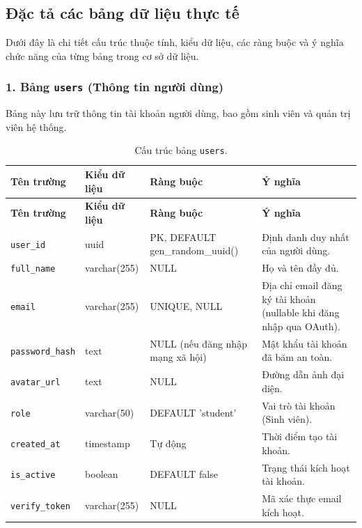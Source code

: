 \subsection{Đặc tả các bảng dữ liệu thực tế}

Dưới đây là chi tiết cấu trúc thuộc tính, kiểu dữ liệu, các ràng buộc và ý nghĩa chức năng của từng bảng trong cơ sở dữ liệu.

\subsubsection*{1. Bảng \texttt{users} (Thông tin người dùng)}

Bảng này lưu trữ thông tin tài khoản người dùng, bao gồm sinh viên và quản trị viên hệ thống.

\begin{footnotesize}\begin{longtable}{|L{3.5cm}|L{2.0cm}|L{3.0cm}|L{5.5cm}|}
\caption{Cấu trúc bảng \texttt{users}.}
\label{tab:users} \\
\hline
\textbf{Tên trường} & \textbf{Kiểu dữ liệu} & \textbf{Ràng buộc} & \textbf{Ý nghĩa} \\
\hline
\endfirsthead
\hline
\textbf{Tên trường} & \textbf{Kiểu dữ liệu} & \textbf{Ràng buộc} & \textbf{Ý nghĩa} \\
\hline
\endhead
\texttt{user\_id} & uuid & PK, DEFAULT gen\_random\_uuid() & Định danh duy nhất của người dùng. \\
\hline
\texttt{full\_name} & varchar(255) & NULL & Họ và tên đầy đủ. \\
\hline
\texttt{email} & varchar(255) & UNIQUE, NULL & Địa chỉ email đăng ký tài khoản (nullable khi đăng nhập qua OAuth). \\
\hline
\texttt{password\_\allowbreak hash} & text & NULL (nếu đăng nhập mạng xã hội) & Mật khẩu tài khoản đã băm an toàn. \\
\hline
\texttt{avatar\_url} & text & NULL & Đường dẫn ảnh đại diện. \\
\hline
\texttt{role} & varchar(50) & DEFAULT 'student' & Vai trò tài khoản (Sinh viên). \\
\hline
\texttt{created\_at} & timestamp & Tự động & Thời điểm tạo tài khoản. \\
\hline
\texttt{is\_active} & boolean & DEFAULT false & Trạng thái kích hoạt tài khoản. \\
\hline
\texttt{verify\_\allowbreak token} & varchar(255) & NULL & Mã xác thực email kích hoạt. \\

\end{longtable}
\end{footnotesize}
